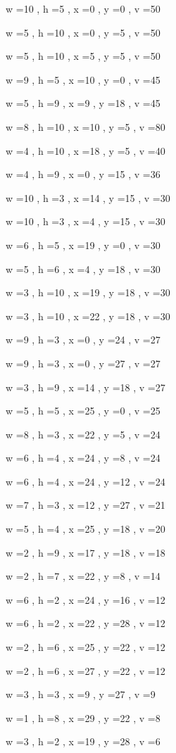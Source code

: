 \documentclass[11pt]{article}
\begin{document}
w =10 , h =5 , x =0 , y =0 , v =50
\par
w =5 , h =10 , x =0 , y =5 , v =50
\par
w =5 , h =10 , x =5 , y =5 , v =50
\par
w =9 , h =5 , x =10 , y =0 , v =45
\par
w =5 , h =9 , x =9 , y =18 , v =45
\par
w =8 , h =10 , x =10 , y =5 , v =80
\par
w =4 , h =10 , x =18 , y =5 , v =40
\par
w =4 , h =9 , x =0 , y =15 , v =36
\par
w =10 , h =3 , x =14 , y =15 , v =30
\par
w =10 , h =3 , x =4 , y =15 , v =30
\par
w =6 , h =5 , x =19 , y =0 , v =30
\par
w =5 , h =6 , x =4 , y =18 , v =30
\par
w =3 , h =10 , x =19 , y =18 , v =30
\par
w =3 , h =10 , x =22 , y =18 , v =30
\par
w =9 , h =3 , x =0 , y =24 , v =27
\par
w =9 , h =3 , x =0 , y =27 , v =27
\par
w =3 , h =9 , x =14 , y =18 , v =27
\par
w =5 , h =5 , x =25 , y =0 , v =25
\par
w =8 , h =3 , x =22 , y =5 , v =24
\par
w =6 , h =4 , x =24 , y =8 , v =24
\par
w =6 , h =4 , x =24 , y =12 , v =24
\par
w =7 , h =3 , x =12 , y =27 , v =21
\par
w =5 , h =4 , x =25 , y =18 , v =20
\par
w =2 , h =9 , x =17 , y =18 , v =18
\par
w =2 , h =7 , x =22 , y =8 , v =14
\par
w =6 , h =2 , x =24 , y =16 , v =12
\par
w =6 , h =2 , x =22 , y =28 , v =12
\par
w =2 , h =6 , x =25 , y =22 , v =12
\par
w =2 , h =6 , x =27 , y =22 , v =12
\par
w =3 , h =3 , x =9 , y =27 , v =9
\par
w =1 , h =8 , x =29 , y =22 , v =8
\par
w =3 , h =2 , x =19 , y =28 , v =6
\par
\newpage
\end{document}
